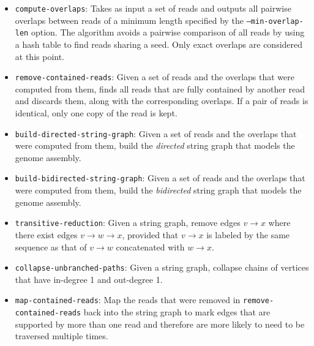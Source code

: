 \documentclass[letterpaper,12pt]{article}
\begin{document}
\begin{itemize}
\item
	{\tt compute-overlaps}:  Takes as input a set of reads and outputs all
	pairwise overlaps between reads of a minimum length specified by the
	{\tt --min-overlap-len} option.  The algorithm avoids a pairwise
	comparison of all reads by using a hash table to find reads sharing a
	seed.  Only exact overlaps are considered at this point.


\item
	{\tt remove-contained-reads}:
	Given a set of reads and the overlaps that were computed from them,
	finds all reads that are fully contained by another read and discards
	them, along with the corresponding overlaps.  If a pair of reads is
	identical, only one copy of the read is kept.

\item
	{\tt build-directed-string-graph}:
	Given a set of reads and the overlaps that were computed from them,
	build the {\em directed} string graph that models the genome assembly.
\item
	{\tt build-bidirected-string-graph}:
	Given a set of reads and the overlaps that were computed from them,
	build the {\em bidirected} string graph that models the genome assembly.


\item
	{\tt transitive-reduction}:
	Given a string graph, remove edges $v \to x$ where there exist edges $v
	\to w \to x$, provided that $v \to x$ is labeled by the same sequence as
	that of $v \to w$ concatenated with $w \to x$.

\item
	{\tt collapse-unbranched-paths}:
	Given a string graph, collapse chains of vertices that have in-degree 1
	and out-degree 1.

\item
	{\tt map-contained-reads}:
	Map the reads that were removed in {\tt remove-contained-reads} back
	into the string graph to mark edges that are supported by more than one
	read and therefore are more likely to need to be traversed multiple
	times.



\end{itemize}
\end{document}
